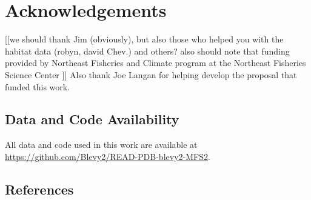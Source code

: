 \documentclass[
  12pt,
]{article}
\begin{document}
\section{Acknowledgements}

{[}{[}we should thank Jim (obviously), but also those who helped you with the habitat data (robyn, david Chev.) and others? also should note that funding provided by Northeast Fisheries and Climate program at the Northeast Fisheries Science Center {]}{]} Also thank Joe Langan for helping develop the proposal that funded this work.

\hypertarget{data-and-code-availability}{%
\subsection{Data and Code Availability}\label{data-and-code-availability}}

All data and code used in this work are available at \url{https://github.com/Blevy2/READ-PDB-blevy2-MFS2}.

\hypertarget{references}{%
\subsection{References}\label{references}}
\end{document}
